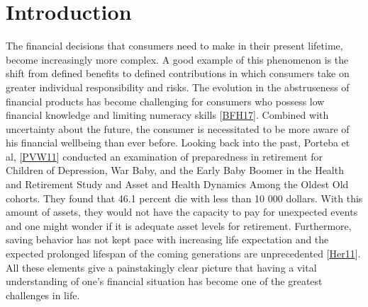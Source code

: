 \documentclass[letterpaper,10pt,english]{jupyterBook}
\begin{document}
\chapter{Introduction}
\label{\detokenize{Introduction:introduction}}\label{\detokenize{Introduction::doc}}
\sphinxAtStartPar
The financial decisions that consumers need to make in their present lifetime, become increasingly more complex. A good example of this phenomenon is the shift from defined benefits to defined contributions in which consumers take on greater individual responsibility and risks. The evolution in the abstruseness of financial products has become challenging for consumers who possess low financial knowledge and limiting numeracy skills {[}\hyperlink{cite.Discussion:id14}{BFH17}{]}. Combined with uncertainty about the future, the consumer is necessitated to be more aware of his financial well\sphinxhyphen{}being than ever before. Looking back into the past, Porteba et al, {[}\hyperlink{cite.Discussion:id16}{PVW11}{]} conducted an examination of preparedness in retirement for Children of Depression, War Baby, and the Early Baby Boomer in the Health and Retirement Study and Asset and Health Dynamics Among the Oldest Old cohorts. They found that 46.1 percent die with less than 10 000 dollars. With this amount of assets, they would not have the capacity to pay for unexpected events and one might wonder if it is adequate asset levels for retirement. Furthermore, saving behavior has not kept pace with increasing life expectation and the expected prolonged lifespan of the coming generations are unprecedented {[}\hyperlink{cite.Discussion:id17}{Her11}{]}. All these elements give a painstakingly clear picture that having a vital understanding of one’s financial situation has become one of the greatest challenges in life.
\end{document}
